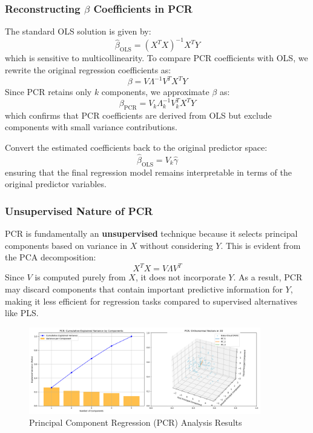 \documentclass[11pt,twoside,a4paper]{article}
\begin{document}
\subsubsection{Reconstructing \( \beta \) Coefficients in PCR}

The standard OLS solution is given by:
\[
\hat{\beta}_{\text{OLS}} = (X^T X)^{-1} X^T Y
\]
which is sensitive to multicollinearity. To compare PCR coefficients with OLS, we rewrite the original regression coefficients as:
\[
\beta = V \Lambda^{-1} V^T X^T Y
\]
Since PCR retains only \( k \) components, we approximate \( \beta \) as:
\[
\beta_{\text{PCR}} = V_k \Lambda_k^{-1} V_k^T X^T Y
\]
which confirms that PCR coefficients are derived from OLS but exclude components with small variance contributions.

Convert the estimated coefficients back to the original predictor space:
    \[
    \hat{\beta}_{\text{OLS}} = V_k \hat{\gamma}
    \]
    ensuring that the final regression model remains interpretable in terms of the original predictor variables.

\subsubsection{Unsupervised Nature of PCR}
PCR is fundamentally an \textbf{unsupervised} technique because it selects principal components based on variance in \( X \) without considering \( Y \). This is evident from the PCA decomposition:
\[
X^T X = V \Lambda V^T
\]
Since \( V \) is computed purely from \( X \), it does not incorporate \( Y \). As a result, PCR may discard components that contain important predictive information for \( Y \), making it less efficient for regression tasks compared to supervised alternatives like PLS.

\begin{figure}[H]
    \centering
    \includegraphics[width=0.9\textwidth]{PCR_Selected_Analysis.png}
    \caption{Principal Component Regression (PCR) Analysis Results}
    \label{fig:PCR_analysis}
\end{figure}
\end{document}
